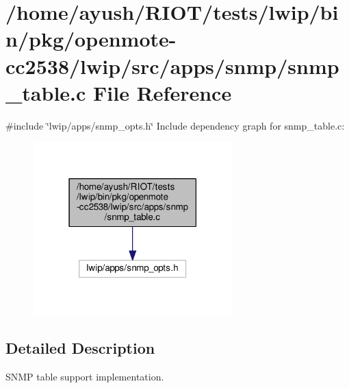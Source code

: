 \hypertarget{openmote-cc2538_2lwip_2src_2apps_2snmp_2snmp__table_8c}{}\section{/home/ayush/\+R\+I\+O\+T/tests/lwip/bin/pkg/openmote-\/cc2538/lwip/src/apps/snmp/snmp\+\_\+table.c File Reference}
\label{openmote-cc2538_2lwip_2src_2apps_2snmp_2snmp__table_8c}
{\ttfamily \#include \char`\"{}lwip/apps/snmp\+\_\+opts.\+h\char`\"{}}\newline
Include dependency graph for snmp\+\_\+table.\+c\+:
\nopagebreak
\begin{figure}[H]
\begin{center}
\leavevmode
\includegraphics[width=219pt]{openmote-cc2538_2lwip_2src_2apps_2snmp_2snmp__table_8c__incl}
\end{center}
\end{figure}


\subsection{Detailed Description}
S\+N\+MP table support implementation. 